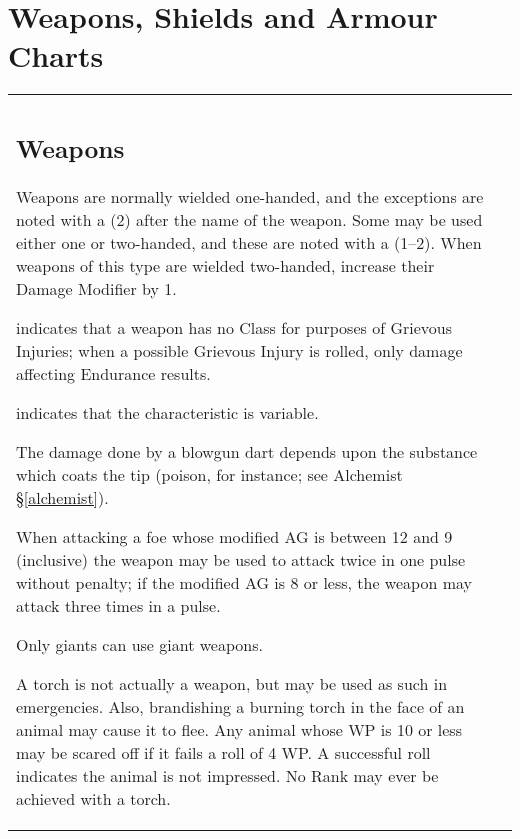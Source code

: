 \section{Weapons, Shields and Armour Charts}

\begin{tabular}[t]{l|r}
\begin{minipage}[t]{2.0in}
\subsection{Weapons}
\label{tables:weapons}

Weapons are normally wielded one-handed, and the exceptions are noted
with a (2) after the name of the weapon.  Some may be used either one
or two-handed, and these are noted with a (1--2).  When weapons of
this type are wielded two-handed, increase their Damage Modifier by 1.

{\setlength\leftmargini{0pt}
\begin{description}
\setlength\itemsep{0pt}
\item[-] indicates that a weapon has no Class for purposes of Grievous
Injuries; when a possible Grievous Injury is rolled, only damage
affecting Endurance results.

\item[V] indicates that the characteristic is variable.

\item[*] The damage done by a blowgun dart depends upon the substance
which coats the tip (poison, for instance; see Alchemist
\S\ref{alchemist}).
\end{description}}

{\setlength\leftmargini{0pt}
\begin{description}
\setlength\itemsep{0pt}
\item[A] When attacking a foe whose modified AG is between 12 and 9
(inclusive) the weapon may be used to attack twice in one pulse
without penalty; if the modified AG is 8 or less, the weapon may
attack three times in a pulse.

\item[B] Only giants can use giant weapons.

\item[C] A torch is not actually a weapon, but may be used as such in
emergencies.  Also, brandishing a burning torch in the face of an
animal may cause it to flee.  Any animal whose WP is 10 or less may be
scared off if it fails a roll of 4 \x WP.  A successful roll indicates
the animal is not impressed.  No Rank may ever be achieved with a
torch.


\end{description}}
\end{minipage}
\end{tabular}
